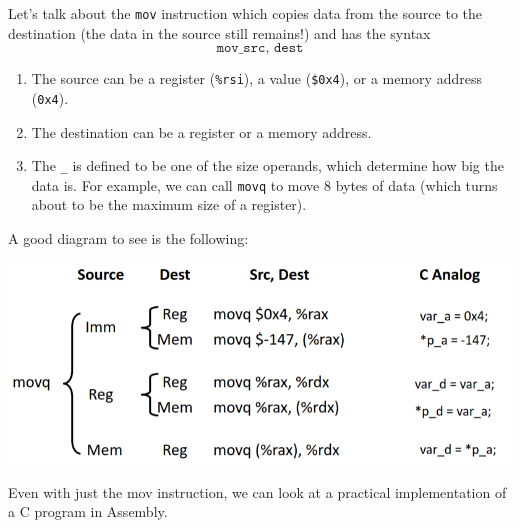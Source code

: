   \begin{definition}[mov]
    Let's talk about the \texttt{mov} instruction which copies data from the source to the destination (the data in the source still remains!) and has the syntax 
    \begin{equation}
      \texttt{mov\_ src, dest}
    \end{equation}
    \begin{enumerate}
      \item The source can be a register (\texttt{\%rsi}), a value (\texttt{\$0x4}), or a memory address (\texttt{0x4}).
      \item The destination can be a register or a memory address. 
      \item The \texttt{\_} is defined to be one of the size operands, which determine how big the data is. For example, we can call \texttt{movq} to move 8 bytes of data (which turns about to be the maximum size of a register). 
    \end{enumerate}
    A good diagram to see is the following: 
    \begin{center}  
      \includegraphics[scale=0.5]{img/movq.png}
    \end{center} 
  \end{definition}

  Even with just the mov instruction, we can look at a practical implementation of a C program in Assembly. 

